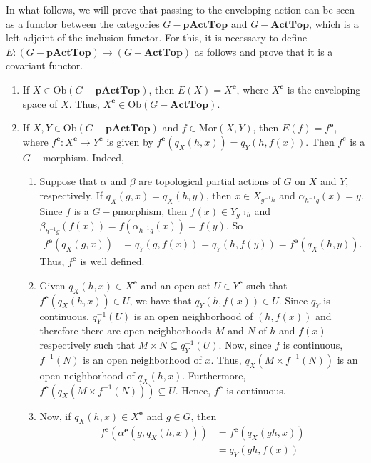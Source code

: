 \documentclass[sn-mathphys-num]{sn-jnl}%
\theoremstyle{thmstyleone}%
\theoremstyle{thmstyletwo}%
\theoremstyle{thmstylethree}%
\begin{document}
In what follows, we will prove that passing to the enveloping action can be seen as a functor between the categories $G-\mathbf{pActTop}$ and $G-\mathbf{ActTop}$, which is a left adjoint of the inclusion functor.
For this,  it is necessary to define $E:(G-\mathbf{pActTop})\to (G-\mathbf{ActTop})$ as follows and prove that it is a covariant functor.
\begin{enumerate}
  \item If $X\in \text{Ob}(G-\mathbf{pActTop})$, then $E(X)=X^\mathbf{e}$, where $X^\mathbf{e}$ is the enveloping space of $X$.
Thus, $X^\mathbf{e}\in\text{Ob}(G-\mathbf{ActTop})$.
  \item If $X,Y\in \text{Ob}(G-\mathbf{pActTop})$ and  $f\in\text{Mor}(X,Y)$, then $E(f)=f^\mathbf{e}$, where $f^\mathbf{e}:X^\mathbf{e}\to Y^\mathbf{e}$ is given by $f^\mathbf{e}(q_X(h,x))=q_Y(h,f(x))$.
Then $f^e$ is a  $G-$morphism.
Indeed,
      \begin{enumerate}
        \item Suppose that $ \alpha $ and $ \beta $ are topological partial actions of $ G $ on $ X $ and $ Y,$ respectively.
If $ q_X (g, x) = q_X (h, y)$,  then $x\in X_{g^{-1}h}$ and $\alpha_{h^{-1}g}(x)=y$.
Since $f$ is a  $G-$pmorphism, then $f(x)\in Y_{g^{-1}h}$ and $\beta_{h^{-1}g}(f(x))=f(\alpha_{h^{-1}g}(x))=f(y).$ So
            \begin{align*}
            f^\mathbf{e}(q_X(g,x))&=q_Y(g,f(x))=q_Y(h,f(y))=f^\mathbf{e}(q_X(h,y)).
            \end{align*}
            Thus, $f^\mathbf{e}$ is well defined.
        \item Given  $q_X(h,x)\in X^\mathbf{e}$ and an open set $U\in Y^\mathbf{e}$ such that $f^\mathbf{e}(q_X(h,x))\in U$, we have that  $q_Y(h,f(x))\in U$.
Since $ q_Y$ is continuous, $ q ^ {- 1} _Y (U) $ is an open neighborhood of $ (h, f (x)) $ and therefore there are open neighborhoods $ M $ and $ N $ of $ h $ and $ f (x) $ respectively such that  $M\times N\subseteq q^{-1}_Y(U)$. Now, since $ f $ is continuous, $ f^{- 1}(N) $ is an open neighborhood of $ x $. Thus, $q_X(M\times f^{-1}(N))$ is an open neighborhood of $ q_X (h, x) $. Furthermore, $f^\mathbf{e}(q_X(M\times f^{-1}(N)))\subseteq U$.
Hence, $ f^\mathbf{e} $ is continuous.
 \item Now, if $q_X(h,x)\in X^\mathbf{e}$ and $g\in G$, then
\begin{align*}
f^\mathbf{e}(\alpha^\mathbf{e}(g,q_X(h,x)))&=f^\mathbf{e}(q_X(gh,x))\\
&=q_Y(gh,f(x))\\

\end{align*}
\end{enumerate}
\end{enumerate}
\end{document}

